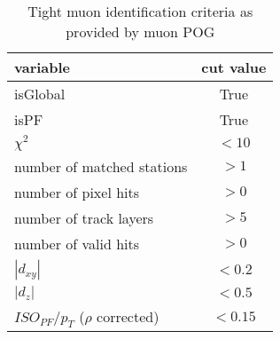 \begin{table}[ht]
    \centering
    \setlength{\tabcolsep}{2em}
    \renewcommand{\arraystretch}{1.25}
    \caption{Tight muon identification criteria as provided by muon POG}
    \label{tab:muon_id}
    \begin{tabular}{l|c}
    variable                            & cut value \\
    \hline
    isGlobal                            & True      \\
    isPF                                & True      \\
    $\chi^{2}$                          & $< 10$    \\
    number of matched stations          & $> 1$     \\
    number of pixel hits                & $> 0$     \\
    number of track layers              & $> 5$     \\
    number of valid hits                & $> 0$     \\
    $|d_{xy}|$                          & $< 0.2$   \\
    $|d_{z}|$                           & $< 0.5$    \\
    \hline
    $ISO_{PF}/p_{T}$ ($\rho$ corrected) & $< 0.15$
    \end{tabular}
\end{table}
